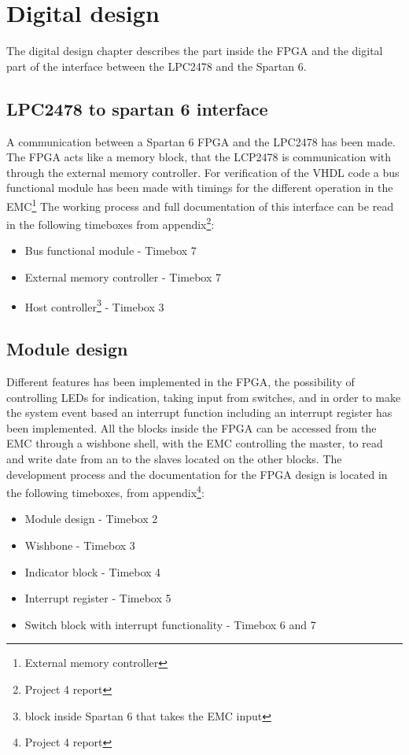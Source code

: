 \chapter{Digital design}\label{chap:digital_design}
The digital design chapter describes the part inside the FPGA and the digital part of the interface between the LPC2478 and the Spartan 6.
\section{LPC2478 to spartan 6 interface} \label{sec:arm_to_fpga}
%
A communication between a Spartan 6 FPGA and the LPC2478 has been made. The FPGA acts like a memory block, that the LCP2478 is communication with through the external memory controller. For verification of the VHDL code a bus functional module has been made with timings for the different operation in the EMC\footnote{External memory controller} The working process and full documentation of this interface can be read in the following timeboxes from appendix\footnote{Project 4 report}:
\begin{itemize}
\item Bus functional module - Timebox 7
\item External memory controller - Timebox 7
\item Host controller\footnote{block inside Spartan 6 that takes the EMC input} - Timebox 3
\end{itemize}
\section{Module design}
%
Different features has been implemented in the FPGA, the possibility of controlling LEDs for indication, taking input from switches, and in order to make the system event based an interrupt function including an interrupt register has been implemented. All the blocks inside the FPGA can be accessed from the EMC through a wishbone shell, with the EMC controlling the master, to read and write date from an to the slaves located on the other blocks. The development process and the documentation for the FPGA design is located in the following timeboxes, from appendix\footnote{Project 4 report}:
\begin{itemize}
\item Module design - Timebox 2
\item Wishbone - Timebox 3
\item Indicator block - Timebox 4
\item Interrupt register - Timebox 5
\item Switch block with interrupt functionality - Timebox 6 and 7
\end{itemize}